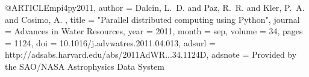 
@ARTICLE{mpi4py2011,
   author = {{Dalcin}, L.~D. and {Paz}, R.~R. and {Kler}, P.~A. and {Cosimo}, A.
	},
    title = "{Parallel distributed computing using Python}",
  journal = {Advances in Water Resources},
     year = 2011,
    month = sep,
   volume = 34,
    pages = {1124},
      doi = {10.1016/j.advwatres.2011.04.013},
   adsurl = {http://adsabs.harvard.edu/abs/2011AdWR...34.1124D},
  adsnote = {Provided by the SAO/NASA Astrophysics Data System}
}